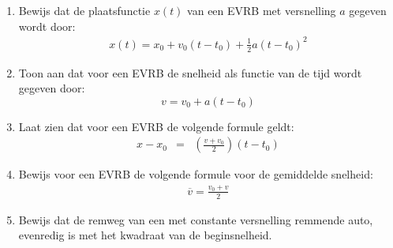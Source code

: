 \begin{enumerate}
\item Bewijs dat de plaatsfunctie $x(t)$ van een EVRB met versnelling $a$ gegeven wordt door:
\begin{eqnarray*}
x(t)=x_0+v_0(t-t_0)+\frac{1}{2}a(t-t_0)^2
\end{eqnarray*}

\item Toon aan dat voor een EVRB de snelheid als functie van de tijd wordt gegeven door:
\[v=v_0+a(t-t_0)\]



\item Laat zien dat voor een EVRB de volgende formule geldt:
\begin{eqnarray*}
x-x_0&=&\left(\frac{v+v_0}{2}\right)(t-t_0)
\end{eqnarray*}

\item Bewijs voor een EVRB de volgende formule voor de gemiddelde snelheid:
\begin{eqnarray*}
\overline{v}=\frac{v_0+v}{2}
\end{eqnarray*}


\item Bewijs dat de remweg van een met constante versnelling remmende auto, evenredig is met het kwadraat van de beginsnelheid.


\end{enumerate}
